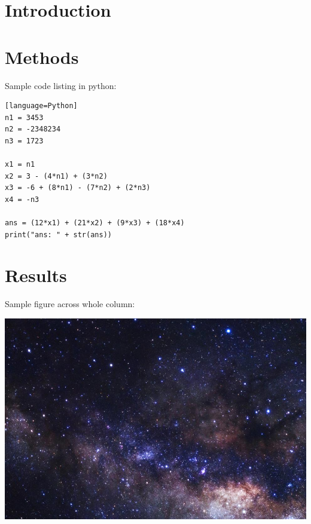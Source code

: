 \documentclass[a4paper, 12pt]{report}
\newenvironment{Figure}	%
  {\par\medskip\noindent\minipage{\linewidth}}
  {\endminipage\par\medskip}
\begin{document}
\begin{multicols}{2}

\section{Introduction}
\lipsum[3]

\section{Methods}
\lipsum[4]
Sample code listing in python:
\begin{lstlisting}[caption=ALG121.m][language=Python]
n1 = 3453
n2 = -2348234
n3 = 1723

x1 = n1
x2 = 3 - (4*n1) + (3*n2)
x3 = -6 + (8*n1) - (7*n2) + (2*n3)
x4 = -n3

ans = (12*x1) + (21*x2) + (9*x3) + (18*x4)
print("ans: " + str(ans))
\end{lstlisting}

\section{Results}
\lipsum[5]

Sample figure across whole column:
\begin{Figure}
 \centering
 \includegraphics[width=\linewidth]{figures/space2.png}
\end{Figure}
\lipsum[5]


\end{multicols}
\end{document}
